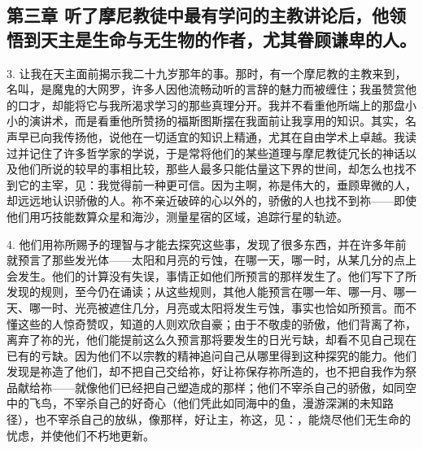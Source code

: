 
\subsection{第三章 听了摩尼教徒中最有学问的主教讲论后，他领悟到天主是生命与无生物的作者，尤其眷顾谦卑的人。}

3. 让我在天主面前揭示我二十九岁那年的事。那时，有一个摩尼教的主教来到，名叫，是魔鬼的大网罗，许多人因他流畅动听的言辞的魅力而被缠住；我虽赞赏他的口才，却能将它与我所渴求学习的那些真理分开。我并不看重他所端上的那盘小小的演讲术，而是看重他所赞扬的福斯图斯摆在我面前让我享用的知识。其实，名声早已向我传扬他，说他在一切适宜的知识上精通，尤其在自由学术上卓越。我读过并记住了许多哲学家的学说，于是常将他们的某些道理与摩尼教徒冗长的神话以及他们所说的较早的事相比较，那些人最多只能估量这下界的世间，却怎么也找不到它的主宰，见：我觉得前一种更可信。因为主啊，祢是伟大的，垂顾卑微的人，却远远地认识骄傲的人。祢不亲近破碎的心以外的，骄傲的人也找不到祢——即使他们用巧技能数算众星和海沙，测量星宿的区域，追踪行星的轨迹。\par

4. 他们用祢所赐予的理智与才能去探究这些事，发现了很多东西，并在许多年前就预言了那些发光体——太阳和月亮的亏蚀，在哪一天，哪一时，从某几分的点上会发生。他们的计算没有失误，事情正如他们所预言的那样发生了。他们写下了所发现的规则，至今仍在诵读；从这些规则，其他人能预言在哪一年、哪一月、哪一天、哪一时、光亮被遮住几分，月亮或太阳将发生亏蚀，事实也恰如所预言。而不懂这些的人惊奇赞叹，知道的人则欢欣自豪；由于不敬虔的骄傲，他们背离了祢，离弃了祢的光，他们能提前这么久预言那将要发生的日光亏缺，却看不见自己现在已有的亏缺。因为他们不以宗教的精神追问自己从哪里得到这种探究的能力。他们发现是祢造了他们，却不把自己交给祢，好让祢保存祢所造的，也不把自我作为祭品献给祢——就像他们已经把自己塑造成的那样；他们不宰杀自己的骄傲，如同空中的飞鸟，不宰杀自己的好奇心（他们凭此如同海中的鱼，漫游深渊的未知路径），也不宰杀自己的放纵，像那样，好让主，祢这，见：，能烧尽他们无生命的忧虑，并使他们不朽地更新。\par

